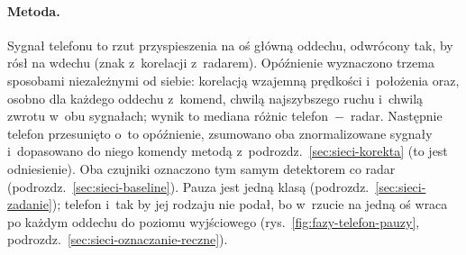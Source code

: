 \documentclass[12pt,a4paper,oneside]{report}
\begin{document}
\paragraph{Metoda.} Sygnał telefonu to rzut przyspieszenia na oś główną
oddechu, odwrócony tak, by rósł na wdechu (znak z~korelacji z~radarem).
Opóźnienie wyznaczono trzema sposobami niezależnymi od siebie: korelacją
wzajemną prędkości i~położenia oraz, osobno dla każdego oddechu z~komend,
chwilą najszybszego ruchu i~chwilą zwrotu w~obu sygnałach; wynik to mediana
różnic telefon~$-$~radar. Następnie telefon przesunięto o~to opóźnienie,
zsumowano oba znormalizowane sygnały i~dopasowano do niego komendy metodą
z~podrozdz.~\ref{sec:sieci-korekta} (to jest odniesienie). Oba czujniki oznaczono
tym samym detektorem co radar (podrozdz.~\ref{sec:sieci-baseline}).
Pauza jest jedną klasą (podrozdz.~\ref{sec:sieci-zadanie}); telefon i~tak by jej rodzaju nie podał,
bo w~rzucie na jedną oś wraca po każdym oddechu do poziomu wyjściowego
(rys.~\ref{fig:fazy-telefon-pauzy}, podrozdz.~\ref{sec:sieci-oznaczanie-reczne}).
\end{document}

